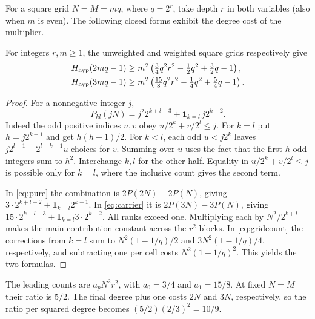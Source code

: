 For a square grid $N=M=mq$, where $q=2^r$, take depth $r$ in both variables (also when $m$ is even). The following closed forms exhibit the degree cost of the multiplier.
\begin{corollary}\label{cor:symmetric}
For integers $r,m\ge1$, the unweighted and weighted square grids respectively give
\begin{align}
 H_{\mathrm{hyp}}(2mq-1)&\ge m^2\left(\tfrac34 q^2 r^2-\tfrac12 q^2+\tfrac32 q-1\right),\label{eq:sym0}\\
 H_{\mathrm{hyp}}(3mq-1)&\ge m^2\left(\tfrac{15}{8}q^2 r^2-\tfrac14 q^2+\tfrac54 q-1\right).
 \label{eq:sym1}
\end{align}
\end{corollary}
\begin{proof}
For a nonnegative integer $j$,
\[
 P_{kl}(jN)=j^2 2^{k+l-3}+\mathbf1_{k=l}\,j2^{k-2}.
\]
Indeed the odd positive indices $u,v$ obey $u/2^k+v/2^l\le j$. For $k=l$ put $h=j2^{k-1}$ and get $h(h+1)/2$. For $k<l$, each odd $u<j2^k$ leaves $j2^{l-1}-2^{l-k-1}u$ choices for $v$. Summing over $u$ uses the fact that the first $h$ odd integers sum to $h^2$. Interchange $k,l$ for the other half. Equality in $u/2^k+v/2^l\le j$ is possible only for $k=l$, where the inclusive count gives the second term.

In \eqref{eq:pure} the combination is $2P(2N)-2P(N)$, giving $3\cdot2^{k+l-2}+\mathbf1_{k=l}2^{k-1}$. In \eqref{eq:carrier} it is $2P(3N)-3P(N)$, giving $15\cdot2^{k+l-3}+\mathbf1_{k=l}3\cdot2^{k-2}$. All ranks exceed one. Multiplying each by $N^2/2^{k+l}$ makes the main contribution constant across the $r^2$ blocks. In \eqref{eq:gridcount} the corrections from $k=l$ sum to $N^2(1-1/q)/2$ and $3N^2(1-1/q)/4$, respectively, and subtracting one per cell costs $N^2(1-1/q)^2$. This yields the two formulas.
\end{proof}

The leading counts are \(a_p N^2r^2\), with \(a_0=3/4\) and \(a_1=15/8\). At fixed \(N=M\) their ratio is \(5/2\). The final degree plus one costs \(2N\) and \(3N\), respectively, so the ratio per squared degree becomes \((5/2)(2/3)^2=10/9\).

